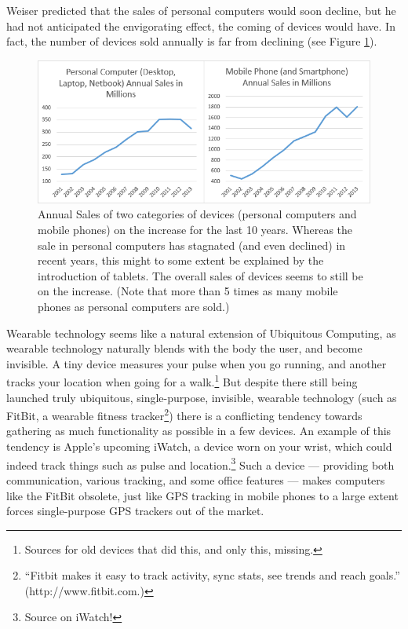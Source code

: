 Weiser predicted that the sales of personal computers would soon decline, but he had not anticipated the envigorating effect, the
coming of devices would have. In fact, the number of devices sold annually is far from declining (see Figure \ref{fig:actual-sales-graph}).

\begin{figure}[htb]
    \centering
    \includegraphics[width=1\textwidth]{multipurpose/actual-sales-graph}
    \caption{Annual Sales of two categories of devices (personal computers and mobile phones) on the increase for the last 10 years.
        Whereas the sale in personal computers has stagnated (and even declined) in recent years, this might to some extent be
        explained by the introduction of tablets. The overall sales of devices seems to still be on the increase. (Note
        that more than 5 times as many mobile phones as personal computers are sold.)\cite{wikipedia-mobiles}\cite{wikipedia-pcs}\protect\footnotemark}
    \label{fig:actual-sales-graph}
\end{figure}


Wearable technology seems like a natural extension of Ubiquitous Computing, as wearable technology naturally blends with the body
the user, and become invisible. A tiny device measures your pulse when you go running, and another tracks your location when going for a
walk.\footnote{Sources for old devices that did this, and only this, missing.} But despite there still being launched truly ubiquitous,
single-purpose, invisible, wearable technology (such as FitBit, a wearable fitness tracker\footnote{``Fitbit makes it easy to track
activity, sync stats, see trends and reach goals.'' (http://www.fitbit.com.)}) there is a conflicting tendency towards gathering as much
functionality as possible in a few devices. An example of this tendency is Apple's upcoming iWatch, a device worn on your wrist, which
could indeed track things such as pulse and location.\footnote{Source on iWatch!} Such a device --- providing both communication,
various tracking, and some office features --- makes computers like the FitBit obsolete, just like GPS tracking in mobile phones to a
large extent forces single-purpose GPS trackers out of the market.

